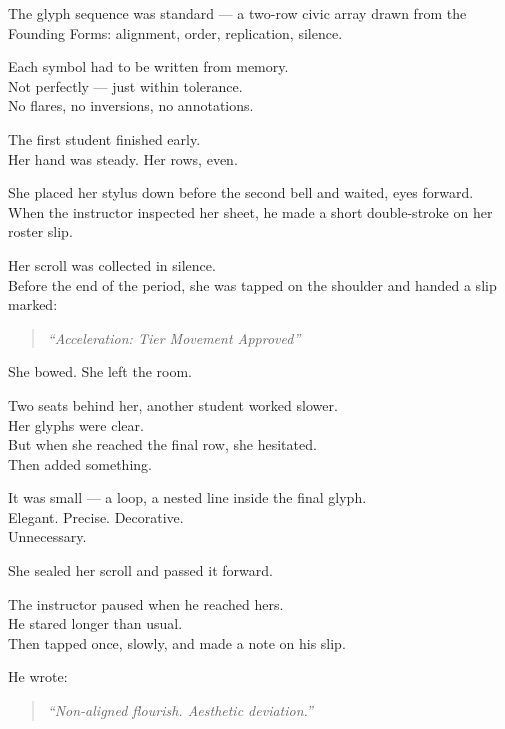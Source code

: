 \documentclass[12pt]{article}
\begin{document}
The glyph sequence was standard — a two-row civic array drawn from the Founding Forms: alignment, order, replication, silence.

Each symbol had to be written from memory.\\
Not perfectly — just within tolerance.\\
No flares, no inversions, no annotations.

\vspace{1em}

The first student finished early.\\
Her hand was steady. Her rows, even.

She placed her stylus down before the second bell and waited, eyes forward.\\
When the instructor inspected her sheet, he made a short double-stroke on her roster slip.

Her scroll was collected in silence.\\
Before the end of the period, she was tapped on the shoulder and handed a slip marked:

\begin{quote}
\textit{“Acceleration: Tier Movement Approved”}
\end{quote}

She bowed. She left the room.

\vspace{1em}

Two seats behind her, another student worked slower.\\
Her glyphs were clear.\\
But when she reached the final row, she hesitated.\\
Then added something.

It was small — a loop, a nested line inside the final glyph.\\
Elegant. Precise. Decorative.\\
Unnecessary.

She sealed her scroll and passed it forward.

The instructor paused when he reached hers.\\
He stared longer than usual.\\
Then tapped once, slowly, and made a note on his slip.

He wrote:

\begin{quote}
\textit{“Non-aligned flourish. Aesthetic deviation.”}
\end{quote}
\end{document}
